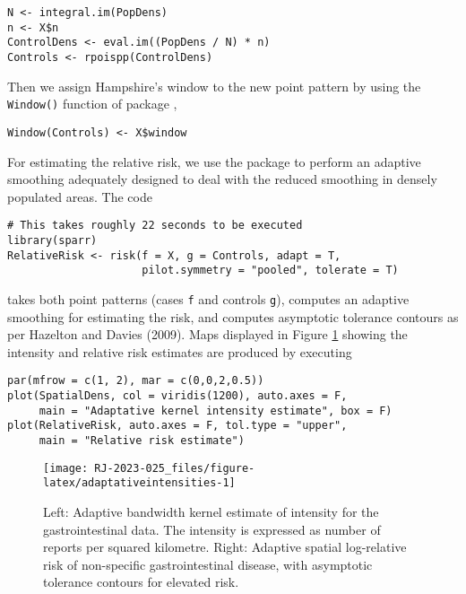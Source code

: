 \begin{verbatim}
N <- integral.im(PopDens) 
n <- X$n
ControlDens <- eval.im((PopDens / N) * n)
Controls <- rpoispp(ControlDens)
\end{verbatim}

Then we assign Hampshire's window to the new point pattern by using the \texttt{Window()} function of package ,

\begin{verbatim}
Window(Controls) <- X$window
\end{verbatim}

For estimating the relative risk, we use the  package to perform an adaptive smoothing adequately designed to deal with the reduced smoothing in densely populated areas. The code

\begin{verbatim}
# This takes roughly 22 seconds to be executed 
library(sparr)
RelativeRisk <- risk(f = X, g = Controls, adapt = T, 
                     pilot.symmetry = "pooled", tolerate = T)
\end{verbatim}

takes both point patterns (cases \texttt{f} and controls \texttt{g}), computes an adaptive smoothing for estimating the risk, and computes asymptotic tolerance contours as per Hazelton and Davies (2009). Maps displayed in Figure \ref{fig:adaptativeintensities} showing the intensity and relative risk estimates are produced by executing

\begin{verbatim}
par(mfrow = c(1, 2), mar = c(0,0,2,0.5)) 
plot(SpatialDens, col = viridis(1200), auto.axes = F,
     main = "Adaptative kernel intensity estimate", box = F)
plot(RelativeRisk, auto.axes = F, tol.type = "upper", 
     main = "Relative risk estimate")
\end{verbatim}

\begin{figure}

{\centering \texttt{[image: RJ-2023-025\_files/figure-latex/adaptativeintensities-1]} 

}

\caption{Left: Adaptive bandwidth kernel estimate of intensity for the gastrointestinal data. The intensity is expressed as number of reports per squared kilometre. Right: Adaptive spatial log-relative risk of non-specific gastrointestinal disease, with asymptotic tolerance contours for elevated risk.}\label{fig:adaptativeintensities}
\end{figure}

